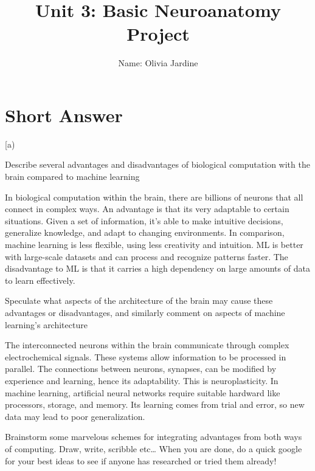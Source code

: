 \documentclass[letterpaper,11pt]{article}
\begin{document}
\title{{\bf Unit 3: Basic Neuroanatomy Project} }
\author{Name: Olivia Jardine}

\date{}
\maketitle

\section*{Short Answer}
\begin{enumerate}[a)
\item Describe several advantages and disadvantages of biological computation with the brain compared to machine learning

\begin{tcolorbox}
In biological computation within the brain, there are billions of neurons that all connect in complex ways. An advantage is that its very adaptable to certain situations. Given a set of information, it's able to make intuitive decisions, generalize knowledge, and adapt to changing environments. In comparison, machine learning is less flexible, using less creativity and intuition. ML is better with large-scale datasets and can process and recognize patterns faster. The disadvantage to ML is that it carries a high dependency on large amounts of data to learn effectively.
\end{tcolorbox}

\item Speculate what aspects of the architecture of the brain may cause these advantages or disadvantages, and similarly comment on aspects of machine learning’s architecture

\begin{tcolorbox}
The interconnected neurons within the brain communicate through complex electrochemical signals. These systems allow information to be processed in parallel. The connections between neurons, synapses, can be modified by experience and learning, hence its adaptability. This is neuroplasticity. In machine learning, artificial neural networks require suitable hardward like processors, storage, and memory. Its learning comes from trial and error, so new data may lead to poor generalization.
\end{tcolorbox} 

\item Brainstorm some marvelous schemes for integrating advantages from both ways of computing. Draw, write, scribble etc… When you are done, do a quick google for your best ideas to see if anyone has researched or tried them already!


\end{enumerate}
\end{document}
